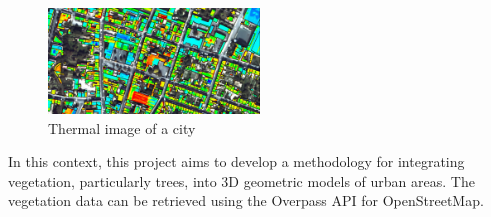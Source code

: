 \documentclass[12pt]{article}
\begin{document}
\begin{figure}[H]
    \centering
    \includegraphics[width=0.5\textwidth]{images/thermographie-aerienne.jpg}
    \caption{Thermal image of a city \cite{img:aerialview}}
\end{figure}

In this context, this project aims to develop a methodology for integrating 
vegetation, particularly trees, into 3D geometric models of urban areas.
The vegetation data can be retrieved using the Overpass API for OpenStreetMap.
\vspace{0.5cm}
\end{document}
